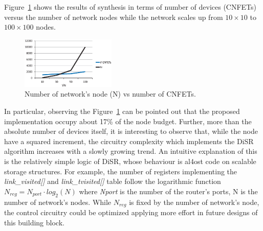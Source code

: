 Figure~\ref{fig:imp_trend} shows the results of synthesis in
terms of number of devices (CNFETs) versus the number of network nodes
while the network scales up from $10\times10$ to $100\times100$ nodes.
\begin{figure}
  \centering
  \includegraphics[width=0.40\textwidth]{pictures/imp_rslt.eps}
  \caption{Number of network's node (N) vs number of CNFETs.}
 \label{fig:imp_trend}
\end{figure}
In particular, observing the Figure~\ref{fig:imp_trend} can 
be pointed out that the proposed implementation occupy  about 17\% of the node budget. 
Further, more than the absolute number of devices itself, it is interesting to
observe that, while the node have a squared increment, the circuitry
complexity which implements the DiSR algorithm increases with a slowly
growing trend.  
An intuitive explanation of this is the relatively simple logic of
DiSR, whose behaviour is al4ost code on scalable storage structures.
For example, the number of registers
implementing the \emph{link\_visited[]} and \emph{link\_tvisited[]}
table follow the logarithmic function $N_{reg}=N_{port} \cdot
log_2(N)$ where \emph{Nport} is the number of the router’s ports, N is
the number of network’s nodes.  While $N_{reg}$ is fixed by the number
of network’s node,  the control circuitry could be optimized applying
more effort in future designs of this building block.


